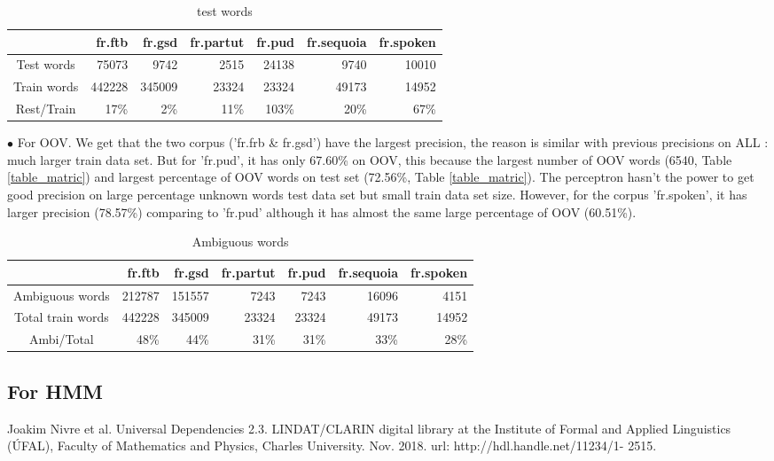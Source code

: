 \documentclass{article}
\begin{document}
\begin{table}[h]
\caption{test words}
\vspace{5pt}
\centering
\begin{tabular}{|c|r|r|r|r|r|r|}
\hline
\ & fr.ftb & fr.gsd & fr.partut & fr.pud & fr.sequoia & fr.spoken \\
\hline
Test words & 75073 & 9742 & 2515 & 24138 & 9740 & 10010 \\
\hline
Train words & 442228 & 345009 & 23324 & 23324 & 49173 & 14952 \\
\hline
Rest/Train & 17\% & 2\% & 11\% & 103\% & 20\% & 67\%\\  
\hline
\end{tabular}
\label{test_on_train}
\end{table}


$\bullet$ For OOV. We get that the two corpus ('fr.frb \& fr.gsd') have the largest precision, the reason is similar with previous precisions on ALL : much larger train data set. But for 'fr.pud', it has only 67.60\% on OOV, this because the largest number of OOV words (6540, Table \ref{table_matric}) and largest percentage of OOV words on test set (72.56\%, Table  \ref{table_matric}). The perceptron hasn't the power to get good precision on large percentage unknown words test data set but small train data set size. However, for the corpus 'fr.spoken', it has larger precision (78.57\%) comparing to 'fr.pud' although it has almost the same large percentage of OOV (60.51\%). 



\begin{table}[h]
\caption{Ambiguous words}
\vspace{5pt}
\centering
\begin{tabular}{|c|r|r|r|r|r|r|}
\hline
\ & fr.ftb & fr.gsd & fr.partut & fr.pud & fr.sequoia & fr.spoken \\
\hline
Ambiguous words & 212787 & 151557 & 7243 & 7243 & 16096 & 4151 \\
\hline
Total train words & 442228 & 345009 & 23324 & 23324 & 49173 & 14952 \\
\hline
Ambi/Total & 48\% & 44\% & 31\% & 31\% & 33\% & 28\%\\  
\hline
\end{tabular}
\end{table}

\subsection{For HMM}

 
% 


Joakim Nivre et al. Universal Dependencies 2.3. LINDAT/CLARIN digital library at
the Institute of Formal and Applied Linguistics (ÚFAL), Faculty of Mathematics and
Physics, Charles University. Nov. 2018. url: http://hdl.handle.net/11234/1-
2515.
\end{document}
